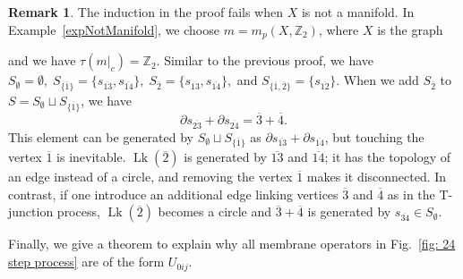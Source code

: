 \documentclass[reprint, amsmath, amssymb, showpacs, floatfix, longbibliography, aps, twocolumn, superscriptaddress, nofootinbib]{revtex4-2}
\newcommand{\ZZ}{{\mathbb Z}}
\theoremstyle{definition}
\newtheorem{remark}{Remark}[section]
\begin{document}
\begin{remark}
	The induction in the proof fails when $X$ is not a manifold. In Example~\ref{expNotManifold}, we choose $m=m_p(X,\ZZ_2)$, where $X$ is the graph
	and we have $\tau(m|_c)=\ZZ_2$. Similar to the previous proof, we have $S_\emptyset=\emptyset,\;S_{\{\overline{1}\}}=\{s_{\overline{13}},s_{\overline{14}}\},\;S_{\overline{2}}=\{s_{\overline{13}},s_{\overline{14}}\},$ and $S_{\{\overline{1},\overline{2}\}}=\{s_{\overline{12}}\}$. When we add $S_{\overline{2}}$ to $S=S_\emptyset\sqcup S_{\{\overline{1}\}}$, we have 
	\begin{equation}
		\partial s_{\overline{23}}+\partial s_{\overline{24}}=\overline{3}+\overline{4}. 
	\end{equation}
	This element can be generated by $S_\emptyset\sqcup S_{\{\overline{1}\}}$ as $\partial s_{\overline{13}}+\partial s_{\overline{14}}$, but touching the vertex $\overline{1}$ is inevitable. $\operatorname{Lk}(\overline{2})$ is generated by $\overline{13}$ and $\overline{14}$; it has the topology of an edge instead of a circle, and removing the vertex $\overline{1}$ makes it disconnected. In contrast, if one introduce an additional edge linking vertices $\overline{3}$ and $\overline{4}$ as in the T-junction process, $\operatorname{Lk}(\overline{2})$ becomes a circle and $\overline{3}+\overline{4}$ is generated by $s_{\overline{34}}\in S_\emptyset$.
\end{remark}

Finally, we give a theorem to explain why all membrane operators in Fig.~\ref{fig: 24 step process} are of the form $U_{0ij}$.
\end{document}
